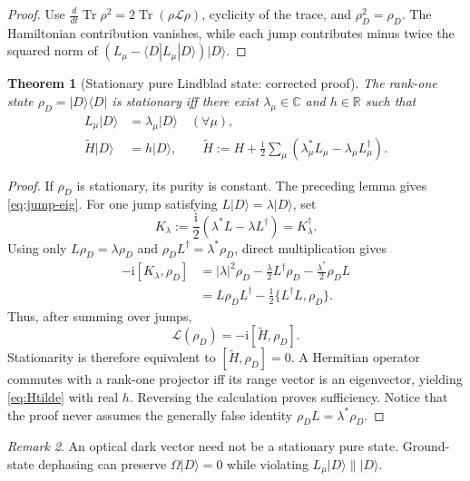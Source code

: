\documentclass[11pt,a4paper]{article}
\newtheorem{theorem}{Theorem}[section]
\theoremstyle{remark}
\newtheorem{remark}[theorem]{Remark}
\newcommand{\im}{\mathrm{i}}
\newcommand{\Tr}{\operatorname{Tr}}
\newcommand{\ket}[1]{|#1\rangle}
\newcommand{\bra}[1]{\langle #1|}
\begin{document}
\begin{proof}
Use $\frac{d}{dt}\Tr\rho^2=2\Tr(\rho\mathcal L\rho)$, cyclicity of the trace,
and $\rho_D^2=\rho_D$.  The Hamiltonian contribution vanishes, while each
jump contributes minus twice the squared norm of
$(L_\mu-\bra D L_\mu\ket D)\ket D$.
\end{proof}

\begin{theorem}[Stationary pure Lindblad state: corrected proof]
The rank-one state $\rho_D=\ket D\bra D$ is stationary iff there exist
$\lambda_\mu\in\mathbb C$ and $h\in\mathbb R$ such that
\begin{align}
L_\mu\ket D&=\lambda_\mu\ket D\quad(\forall\mu),
\label{eq:jump-eig}\\
\widetilde H\ket D&=h\ket D,
\qquad
\widetilde H:=H+\frac{\im}{2}\sum_\mu
(\lambda_\mu^*L_\mu-\lambda_\mu L_\mu^\dagger).
\label{eq:Htilde}
\end{align}
\end{theorem}

\begin{proof}
If $\rho_D$ is stationary, its purity is constant.  The preceding lemma gives
\eqref{eq:jump-eig}.  For one jump satisfying $L\ket D=\lambda\ket D$, set
\[
K_\lambda:=\frac{\im}{2}(\lambda^*L-\lambda L^\dagger)=K_\lambda^\dagger.
\]
Using only $L\rho_D=\lambda\rho_D$ and
$\rho_D L^\dagger=\lambda^*\rho_D$, direct multiplication gives
\begin{align*}
-\im[K_\lambda,\rho_D]
&=|\lambda|^2\rho_D
-\frac{\lambda}{2}L^\dagger\rho_D
-\frac{\lambda^*}{2}\rho_D L\\
&=L\rho_D L^\dagger
-\frac12\{L^\dagger L,\rho_D\}.
\end{align*}
Thus, after summing over jumps,
\[
\mathcal L(\rho_D)=-\im[\widetilde H,\rho_D].
\]
Stationarity is therefore equivalent to
$[\widetilde H,\rho_D]=0$.  A Hermitian operator commutes with a rank-one
projector iff its range vector is an eigenvector, yielding
\eqref{eq:Htilde} with real $h$.  Reversing the calculation proves
sufficiency.  Notice that the proof never assumes the generally false
identity $\rho_D L=\lambda^*\rho_D$.
\end{proof}

\begin{remark}
An optical dark vector need not be a stationary pure state.  Ground-state
dephasing can preserve $\Omega\ket D=0$ while violating
$L_\mu\ket D\parallel\ket D$.
\end{remark}

\end{document}
